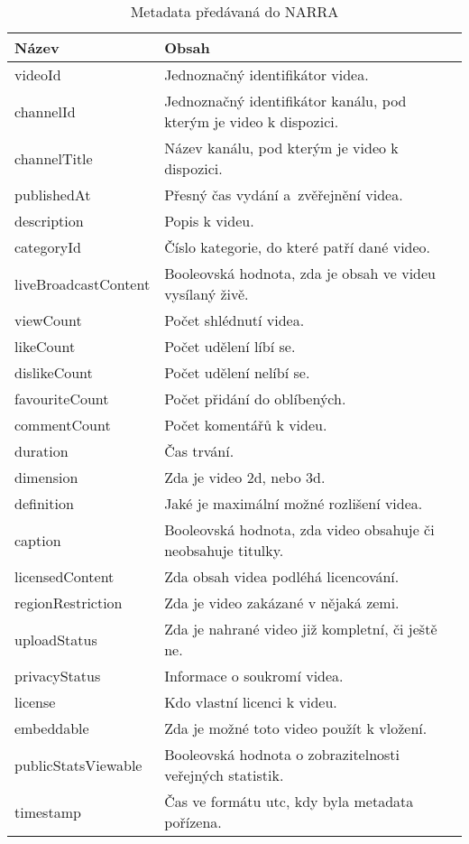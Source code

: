 \begin{table}[!ht]
\centering
\begin{tabular}{| p{} | p{} |}
\hline
	\textbf{Název} & \textbf{Obsah} \\
\hline
\hline
	videoId & Jednoznačný identifikátor videa. \\
\hline
	channelId & Jednoznačný identifikátor kanálu, pod kterým je video k dispozici. \\
\hline
	channelTitle & Název kanálu, pod kterým je video k dispozici. \\
\hline
	publishedAt & Přesný čas vydání a~zvěřejnění videa. \\
\hline
	description & Popis k videu. \\
\hline
	categoryId & Číslo kategorie, do které patří dané video. \\
\hline
	liveBroadcastContent & Booleovská hodnota, zda je obsah ve videu vysílaný živě. \\
\hline
	viewCount & Počet shlédnutí videa. \\
\hline
	likeCount & Počet udělení líbí se. \\
\hline
	dislikeCount & Počet udělení nelíbí se. \\
\hline
	favouriteCount & Počet přidání do oblíbených. \\
\hline
	commentCount & Počet komentářů k videu. \\
\hline
	duration & Čas trvání. \\
\hline
	dimension & Zda je video 2d, nebo 3d. \\
\hline
	definition & Jaké je maximální možné rozlišení videa. \\
\hline
	caption & Booleovská hodnota, zda video obsahuje či neobsahuje titulky. \\
\hline
	licensedContent & Zda obsah videa podléhá licencování. \\
\hline
	regionRestriction & Zda je video zakázané v nějaká zemi. \\
\hline
	uploadStatus & Zda je nahrané video již kompletní, či ještě ne. \\
\hline
	privacyStatus & Informace o soukromí videa. \\
\hline
	license & Kdo vlastní licenci k videu. \\
\hline
	embeddable & Zda je možné toto video použít k vložení. \\
\hline
	publicStatsViewable & Booleovská hodnota o zobrazitelnosti veřejných statistik. \\
\hline
	timestamp & Čas ve formátu utc, kdy byla metadata pořízena. \\
\hline
\end{tabular}
\caption[Metadata předávaná do NARRA]{Metadata předávaná do NARRA}\label{tab:bson}
\end{table}


